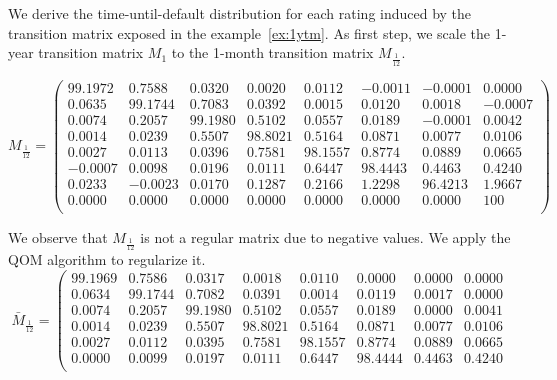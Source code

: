 \documentclass[11pt,fleqn]{book} %
\begin{document}
\begin{example}
	\label{ex:pdftm}
	We derive the time-until-default distribution for each rating induced by the 
	transition matrix exposed in the example~\ref{ex:1ytm}. As first step, we scale 
	the 1-year transition matrix $M_1$ to the 1-month transition matrix 
	$M_{\frac{1}{12}}$.
	{\small
	\begin{displaymath}
		M_{\frac{1}{12}} = \left(
		\begin{array}{cccccccc}
			99.1972 &  0.7588 &  0.0320 &  0.0020 &  0.0112 & -0.0011 & -0.0001 &   0.0000 \\
			 0.0635 & 99.1744 &  0.7083 &  0.0392 &  0.0015 &  0.0120 &  0.0018 &  -0.0007 \\
			 0.0074 &  0.2057 & 99.1980 &  0.5102 &  0.0557 &  0.0189 & -0.0001 &   0.0042 \\
			 0.0014 &  0.0239 &  0.5507 & 98.8021 &  0.5164 &  0.0871 &  0.0077 &   0.0106 \\
			 0.0027 &  0.0113 &  0.0396 &  0.7581 & 98.1557 &  0.8774 &  0.0889 &   0.0665 \\
			-0.0007 &  0.0098 &  0.0196 &  0.0111 &  0.6447 & 98.4443 &  0.4463 &   0.4240 \\
			 0.0233 & -0.0023 &  0.0170 &  0.1287 &  0.2166 &  1.2298 & 96.4213 &   1.9667 \\
			 0.0000 &  0.0000 &  0.0000 &  0.0000 &  0.0000 &  0.0000 &  0.0000 & 100 \\
		\end{array}
		\right)
	\end{displaymath}\par}
	We observe that $M_{\frac{1}{12}}$ is not a regular matrix due to negative
	values. We apply the QOM algorithm to regularize it.
	{\small
	\begin{displaymath}
		\bar{M}_{\frac{1}{12}} = \left(
		\begin{array}{cccccccc}
			99.1969 &  0.7586 &  0.0317 &  0.0018 &  0.0110 &  0.0000 &  0.0000 &   0.0000 \\
			 0.0634 & 99.1744 &  0.7082 &  0.0391 &  0.0014 &  0.0119 &  0.0017 &   0.0000 \\
			 0.0074 &  0.2057 & 99.1980 &  0.5102 &  0.0557 &  0.0189 &  0.0000 &   0.0041 \\
			 0.0014 &  0.0239 &  0.5507 & 98.8021 &  0.5164 &  0.0871 &  0.0077 &   0.0106 \\
			 0.0027 &  0.0112 &  0.0395 &  0.7581 & 98.1557 &  0.8774 &  0.0889 &   0.0665 \\
			 0.0000 &  0.0099 &  0.0197 &  0.0111 &  0.6447 & 98.4444 &  0.4463 &   0.4240 \\

\end{array}
\end{displaymath}}
\end{example}
\end{document}
